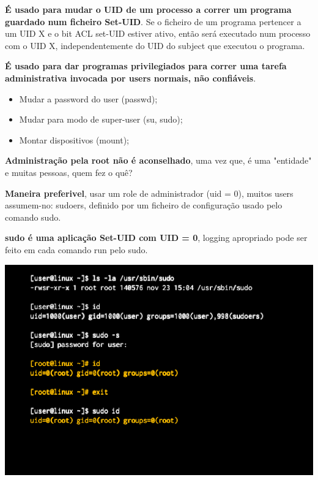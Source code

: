 \documentclass{article}
\begin{document}
\begin{flushleft}
  \textbf{É usado para mudar o UID de um processo a correr um programa guardado num
  ficheiro Set-UID}. Se o ficheiro de um programa pertencer a um UID X e o bit ACL
  set-UID estiver ativo, então será executado num processo com o UID X,
  independentemente do UID do subject que executou o programa.

  \pagebreak

  \textbf{É usado para dar programas privilegiados para correr
  uma tarefa administrativa invocada por users normais, não confiáveis}.
  \begin{itemize}
    \item Mudar a password do user (passwd);
    \item Mudar para modo de super-user (su, sudo);
    \item Montar dispositivos (mount);
  \end{itemize}

  \vspace{2mm}

  \textbf{Administração pela root não é aconselhado}, uma vez que, é
  uma "entidade" e muitas pessoas, quem fez o quê?

  \vspace{2mm}

  \textbf{Maneira preferivel}, usar um role de administrador
  (uid = 0), muitos users assumem-no: sudoers, definido por um
  ficheiro de configuração usado pelo comando sudo.

  \vspace{2mm}

  \textbf{sudo é uma aplicação Set-UID com UID = 0}, logging apropriado
  pode ser feito em cada comando run pelo sudo.

  \begin{center}
    \includegraphics[scale=0.4]{38}
  \end{center}
\end{flushleft}
\end{document}
